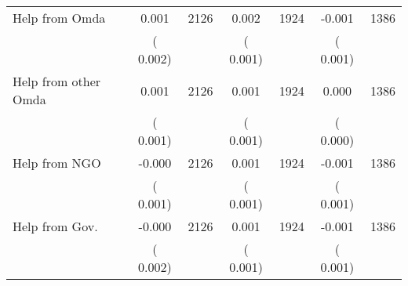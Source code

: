 \begin{tabular}{l*{6}{c}}
Help from Omda        &              0.001      &       2126       &              0.002      &       1924       &             -0.001      &       1386       \\
                       &       (       0.002)            &                               &       (       0.001)            &                               &       (       0.001)            &                               \\
Help from other Omda        &              0.001      &       2126       &              0.001      &       1924       &              0.000      &       1386       \\
                       &       (       0.001)            &                               &       (       0.001)            &                               &       (       0.000)            &                               \\
Help from NGO        &             -0.000      &       2126       &              0.001      &       1924       &             -0.001      &       1386       \\
                       &       (       0.001)            &                               &       (       0.001)            &                               &       (       0.001)            &                               \\
Help from Gov.        &             -0.000      &       2126       &              0.001      &       1924       &             -0.001      &       1386       \\
                       &       (       0.002)            &                               &       (       0.001)            &                               &       (       0.001)            &                               \\
\hline \end{tabular}